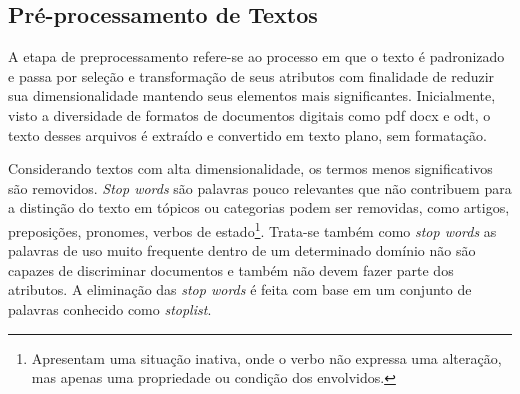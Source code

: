 \subsection{Pré-processamento de Textos}











A etapa de preprocessamento refere-se ao processo em que o texto é padronizado e passa por seleção e transformação de seus atributos com finalidade de reduzir sua dimensionalidade mantendo seus elementos mais significantes.
Inicialmente, visto a diversidade de formatos de documentos digitais como pdf docx e odt, o texto desses arquivos é extraído e convertido em texto plano, sem formatação.

Considerando textos com alta dimensionalidade, os termos menos significativos são removidos.
\textit{Stop words} são palavras pouco relevantes que não contribuem para a distinção do texto em tópicos ou categorias podem ser removidas, como artigos, preposições, pronomes, verbos de estado\footnote{Apresentam uma situação inativa, onde o verbo não expressa uma alteração, mas apenas uma propriedade ou condição dos envolvidos.}. Trata-se também como \textit{stop words} as palavras de uso muito frequente dentro de um determinado domínio não são capazes de discriminar documentos e também não devem fazer parte dos atributos. A eliminação das \textit{stop words} é feita com base em um conjunto de palavras conhecido como \textit{stoplist}.

